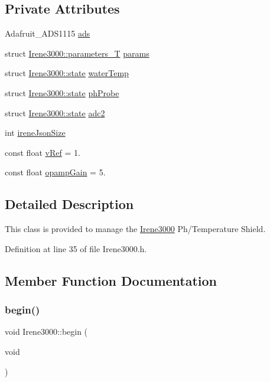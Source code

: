\subsection*{Private Attributes}
\begin{DoxyCompactItemize}
\item 
Adafruit\+\_\+\+A\+D\+S1115 \hyperlink{classIrene3000_a1215e77ba761c9908d80d691f149e135}{ads}
\item 
struct \hyperlink{structIrene3000_1_1parameters__T}{Irene3000\+::parameters\+\_\+T} \hyperlink{classIrene3000_a136585a5ee7f9ac6ab52175fa153f8e3}{params}
\item 
struct \hyperlink{structIrene3000_1_1state}{Irene3000\+::state} \hyperlink{classIrene3000_af05612c78c758ce9db316c75ad937130}{water\+Temp}
\item 
struct \hyperlink{structIrene3000_1_1state}{Irene3000\+::state} \hyperlink{classIrene3000_a997a4ee466fa1d5416e07e444965dc9e}{ph\+Probe}
\item 
struct \hyperlink{structIrene3000_1_1state}{Irene3000\+::state} \hyperlink{classIrene3000_aae3a95a1c83c766cd2f299ce471c337e}{adc2}
\item 
int \hyperlink{classIrene3000_a6534710e4c81669dcc828d2c5450fabe}{irene\+Json\+Size}
\item 
const float \hyperlink{classIrene3000_a018e7ff9bee57e6d2b298667a668ba7e}{v\+Ref} = 1.
\item 
const float \hyperlink{classIrene3000_a4e588985ca74e5076029d5dee81034f2}{opamp\+Gain} = 5.
\end{DoxyCompactItemize}


\subsection{Detailed Description}
This class is provided to manage the \hyperlink{classIrene3000}{Irene3000} Ph/\+Temperature Shield. 

Definition at line 35 of file Irene3000.\+h.



\subsection{Member Function Documentation}
\mbox{\label{classIrene3000_ad5891806c500ae1007afe52b9e304c2b}} 
\subsubsection{\texorpdfstring{begin()}{begin()}}
{\footnotesize\ttfamily void Irene3000\+::begin (\begin{DoxyParamCaption}\item[{void}]{ }\end{DoxyParamCaption})}

